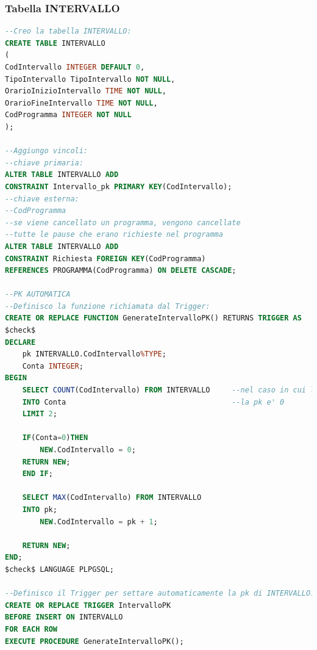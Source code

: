 \documentclass[a4page]{article}
\begin{document}
\subsubsection{Tabella INTERVALLO}
\begin{lstlisting}[language=SQL,
        deletekeywords={IDENTITY,INT},
        morekeywords={clustered},    
        framesep=10pt,
        framextopmargin=10pt]
--Creo la tabella INTERVALLO: 
CREATE TABLE INTERVALLO
(
CodIntervallo INTEGER DEFAULT 0,
TipoIntervallo TipoIntervallo NOT NULL,
OrarioInizioIntervallo TIME NOT NULL,
OrarioFineIntervallo TIME NOT NULL,
CodProgramma INTEGER NOT NULL
);

--Aggiungo vincoli:
--chiave primaria:
ALTER TABLE INTERVALLO ADD 
CONSTRAINT Intervallo_pk PRIMARY KEY(CodIntervallo);
--chiave esterna:
--CodProgramma
--se viene cancellato un programma, vengono cancellate
--tutte le pause che erano richieste nel programma
ALTER TABLE INTERVALLO ADD
CONSTRAINT Richiesta FOREIGN KEY(CodProgramma)
REFERENCES PROGRAMMA(CodProgramma) ON DELETE CASCADE;

--PK AUTOMATICA
--Definisco la funzione richiamata dal Trigger:
CREATE OR REPLACE FUNCTION GenerateIntervalloPK() RETURNS TRIGGER AS
$check$
DECLARE
	pk INTERVALLO.CodIntervallo%TYPE;
	Conta INTEGER;
BEGIN
	SELECT COUNT(CodIntervallo) FROM INTERVALLO		--nel caso in cui la tabella sia vuota
	INTO Conta										--la pk e' 0
	LIMIT 2;
	
	IF(Conta=0)THEN				
		NEW.CodIntervallo = 0;	
	RETURN NEW;
	END IF;
	
	SELECT MAX(CodIntervallo) FROM INTERVALLO
	INTO pk;
		NEW.CodIntervallo = pk + 1;

	RETURN NEW;
END;
$check$ LANGUAGE PLPGSQL;

--Definisco il Trigger per settare automaticamente la pk di INTERVALLO:
CREATE OR REPLACE TRIGGER IntervalloPK
BEFORE INSERT ON INTERVALLO
FOR EACH ROW
EXECUTE PROCEDURE GenerateIntervalloPK();        

\end{lstlisting}
\end{document}
